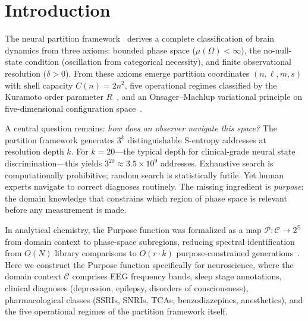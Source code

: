 \documentclass[aps,prd,twocolumn,superscriptaddress,floatfix,nofootinbib]{revtex4-2}
\theoremstyle{remark}
\newcommand{\Purpose}{\mathcal{P}}
\newcommand{\Context}{\mathcal{C}}
\newcommand{\Sspace}{\mathbb{S}}
\begin{document}
\maketitle

\section{Introduction}
\label{sec:introduction}

The neural partition framework~\cite{sachikonye2026regime,sachikonye2026aperture,sachikonye2026operator} derives a complete classification of brain dynamics from three axioms: bounded phase space ($\mu(\Omega) < \infty$), the no-null-state condition (oscillation from categorical necessity), and finite observational resolution ($\delta > 0$).
From these axioms emerge partition coordinates $(n, \ell, m, s)$ with shell capacity $C(n) = 2n^2$, five operational regimes classified by the Kuramoto order parameter $R$~\cite{kuramoto1975,strogatz2000}, and an Onsager--Machlup variational principle on five-dimensional configuration space~\cite{sachikonye2026lagrangian}.

A central question remains: \emph{how does an observer navigate this space?}
The partition framework generates $3^k$ distinguishable S-entropy addresses at resolution depth $k$.
For $k = 20$---the typical depth for clinical-grade neural state discrimination---this yields $3^{20} \approx 3.5 \times 10^9$ addresses.
Exhaustive search is computationally prohibitive; random search is statistically futile.
Yet human experts navigate to correct diagnoses routinely.
The missing ingredient is \emph{purpose}: the domain knowledge that constrains which region of phase space is relevant before any measurement is made.

In analytical chemistry, the Purpose function was formalized as a map $\Purpose\colon \Context \to 2^{\Sspace}$ from domain context to phase-space subregions, reducing spectral identification from $O(N)$ library comparisons to $O(r \cdot k)$ purpose-constrained generations~\cite{sachikonye2026purpose}.
Here we construct the Purpose function specifically for neuroscience, where the domain context $\Context$ comprises EEG frequency bands, sleep stage annotations, clinical diagnoses (depression, epilepsy, disorders of consciousness), pharmacological classes (SSRIs, SNRIs, TCAs, benzodiazepines, anesthetics), and the five operational regimes of the partition framework itself.
\end{document}

